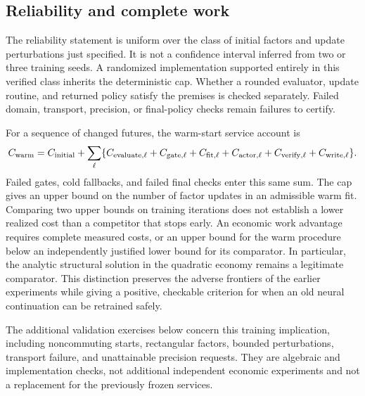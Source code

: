 \subsection{Reliability and complete work}
The reliability statement is uniform over the class of initial factors and
update perturbations just specified. It is not a confidence interval inferred
from two or three training seeds. A randomized implementation supported
entirely in this verified class inherits the deterministic cap. Whether a
rounded evaluator, update routine, and returned policy satisfy the premises
is checked separately. Failed domain, transport, precision, or final-policy
checks remain failures to certify.

For a sequence of changed futures, the warm-start service account is
\begin{equation}\label{eq:r33work}
 C_{\rm warm}=C_{\rm initial}+\sum_\ell
 \{C_{\rm evaluate,\ell}+C_{\rm gate,\ell}
   +C_{\rm fit,\ell}+C_{\rm actor,\ell}
   +C_{\rm verify,\ell}+C_{\rm write,\ell}\}.
\end{equation}
Failed gates, cold fallbacks, and failed final checks enter this same sum.
The cap gives an upper bound on the number of factor updates in an admissible
warm fit. Comparing two upper bounds on training iterations does not establish
a lower realized cost than a competitor that stops early. An economic work
advantage requires complete measured costs, or an upper bound for the warm
procedure below an independently justified lower bound for its comparator.
In particular, the analytic structural solution in the quadratic economy
remains a legitimate comparator. This distinction preserves the adverse
frontiers of the earlier experiments while giving a positive, checkable
criterion for when an old neural continuation can be retrained safely.

The additional validation exercises below concern this training implication,
including noncommuting starts, rectangular factors, bounded perturbations,
transport failure, and unattainable precision requests. They are algebraic
and implementation checks, not additional independent economic experiments
and not a replacement for the previously frozen services.
